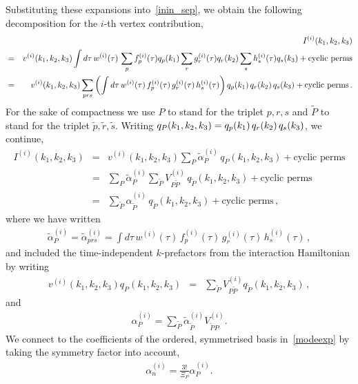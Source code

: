 Substituting these expansions into~\eqref{inin_sep}, we obtain the following decomposition for the $i$-th vertex contribution,
\begin{eqnarray}\label{inin_kdep}
    &&I^{(i)}(k_1,k_2,k_3)\nonumber\\
    &=& v^{(i)}(k_1, k_2,k_3)\int d\tau\, w^{(i)}(\tau)\, \sum_p f_p^{(i)}(\tau) q_p(k_1)\sum_r g_r^{(i)}(\tau) q_r(k_2)\sum_s h_s^{(i)}(\tau) q_s(k_3) + \text{cyclic perms}\nonumber\\	
	&=& v^{(i)}(k_1, k_2,k_3)\sum_{prs}\left(\int d\tau\, w^{(i)}(\tau)\, f_p^{(i)}(\tau)\, g_r^{(i)}(\tau) \,h_s^{(i)}(\tau)\right)q_p(k_1)\,q_r(k_2)\,q_s(k_3) + \text{cyclic perms}\nonumber\,.
\end{eqnarray}
For the sake of compactness we use $P$ to stand for the triplet $p,r,s$ and $\tilde{P}$ to stand for the triplet $\tilde{p},\tilde{r},\tilde{s}$.
Writing $q_{P}(k_1,k_2,k_3)=q_p(k_1)\,q_r(k_2)\,q_s(k_3)$,
we continue,
\begin{eqnarray}\label{inin_kdep}
    I^{(i)}(k_1,k_2,k_3) & =& v^{(i)}(k_1, k_2,k_3) \sum_{P} \tilde{\alpha}_{P}^{(i)}\,  q_{P}(k_1,k_2,k_3) + \text{cyclic perms}\nonumber\\
    & =& \sum_{P} \tilde{\alpha}_{P}^{(i)}\sum_{\tilde{P}}V^{(i)}_{P\tilde{P}}\,  q_{\tilde{P}}(k_1,k_2,k_3) + \text{cyclic perms}\nonumber\\
    & =& \sum_{\tilde{P}} \alpha_{\tilde{P}}^{(i)}\,  q_{\tilde{P}}(k_1,k_2,k_3) + \text{cyclic perms} \,,
\end{eqnarray}
where we have written
\begin{eqnarray}\label{inin_kindep}
\tilde{\alpha}_P^{(i)} =  \tilde{\alpha}_{prs}^{(i)} 	= \int d\tau\, w^{(i)}(\tau)\, f_p^{(i)}(\tau) \,g_r^{(i)}(\tau) \,h_s^{(i)}(\tau)\,,
\end{eqnarray}
and included the time-independent $k$-prefactors from the interaction Hamiltonian by writing
\begin{eqnarray}\label{V_definition}
    v^{(i)}(k_1, k_2,k_3)q_P(k_1,k_2,k_3) &=& \sum_{\tilde{P}}V^{(i)}_{P\tilde{P}}q_{\tilde{P}}(k_1,k_2,k_3)\,,
\end{eqnarray}
and
\begin{eqnarray}
    \alpha_P^{(i)} = \sum_{\tilde{P}} \tilde{\alpha}_{\tilde{P}}^{(i)}V^{(i)}_{\tilde{P}P}.
\end{eqnarray}
We connect to the coefficients of the ordered, symmetrised basis in~\eqref{modeexp} by taking the symmetry factor into account,
\begin{eqnarray}
    \alpha_n^{(i)} = \frac{3!}{\Xi_P}\alpha_P^{(i)}.
\end{eqnarray}
